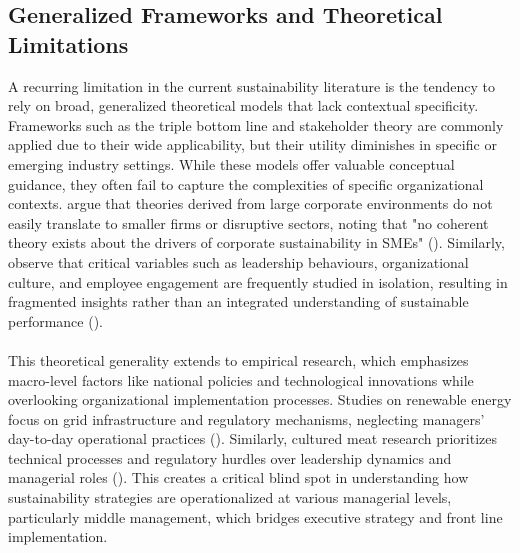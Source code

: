 	\subsection{Generalized Frameworks and Theoretical Limitations}
	A recurring limitation in the current sustainability literature is the tendency to rely on broad, generalized theoretical models that lack contextual specificity. Frameworks such as the triple bottom line and stakeholder theory are commonly applied due to their wide applicability, but their utility diminishes in specific or emerging industry settings. While these models offer valuable conceptual guidance, they often fail to capture the complexities of specific organizational contexts. \citeauthor{kustbash} argue that theories derived from large corporate environments do not easily translate to smaller firms or disruptive sectors, noting that "no coherent theory exists about the drivers of corporate sustainability in SMEs" (\textcite{kustbash}). Similarly, \citeauthor{keil2024a} observe that critical variables such as leadership behaviours, organizational culture, and employee engagement are frequently studied in isolation, resulting in fragmented insights rather than an integrated understanding of sustainable performance (\textcite{keil2024a}). 

	\paragraph*{} This theoretical generality extends to empirical research, which emphasizes macro-level factors like national policies and technological innovations while overlooking organizational implementation processes. Studies on renewable energy focus on grid infrastructure and regulatory mechanisms, neglecting managers' day-to-day operational practices (\textcite{IRENA2020}). Similarly, cultured meat research prioritizes technical processes and regulatory hurdles over leadership dynamics and managerial roles (\textcite{Bryant2020}). This creates a critical blind spot in understanding how sustainability strategies are operationalized at various managerial levels, particularly middle management, which bridges executive strategy and front line implementation.
	

